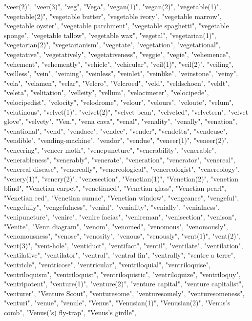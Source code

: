 "veer(2)",
"veer(3)",
"veg",
"Vega",
"vegan(1)",
"vegan(2)",
"vegetable(1)",
"vegetable(2)",
"vegetable butter",
"vegetable ivory",
"vegetable marrow",
"vegetable oyster",
"vegetable parchment",
"vegetable spaghetti",
"vegetable sponge",
"vegetable tallow",
"vegetable wax",
"vegetal",
"vegetarian(1)",
"vegetarian(2)",
"vegetarianism",
"vegetate",
"vegetation",
"vegetational",
"vegetative",
"vegetatively",
"vegetativeness",
"veggie",
"vegie",
"vehemence",
"vehement",
"vehemently",
"vehicle",
"vehicular",
"veil(1)",
"veil(2)",
"veiling",
"veilless",
"vein",
"veining",
"veinless",
"veinlet",
"veinlike",
"veinstone",
"veiny",
"vela",
"velamen",
"velar",
"Velcro",
"Velcroed",
"veld",
"veldschoen",
"veldt",
"veleta",
"velitation",
"velleity",
"vellum",
"velocimeter",
"velocipede",
"velocipedist",
"velocity",
"velodrome",
"velour",
"velours",
"veloute",
"velum",
"velutinous",
"velvet(1)",
"velvet(2)",
"velvet bean",
"velveted",
"velveteen",
"velvet glove",
"velvety",
"Ven.",
"vena cava",
"venal",
"venality",
"venally",
"venation",
"venational",
"vend",
"vendace",
"vendee",
"vender",
"vendetta",
"vendeuse",
"vendible",
"vending-machine",
"vendor",
"vendue",
"veneer(1)",
"veneer(2)",
"veneering",
"veneer-moth",
"venepuncture",
"venerability",
"venerable",
"venerableness",
"venerably",
"venerate",
"veneration",
"venerator",
"venereal",
"venereal disease",
"venereally",
"venereological",
"venereologist",
"venereology",
"venery(1)",
"venery(2)",
"venesection",
"Venetian(1)",
"Venetian(2)",
"venetian blind",
"Venetian carpet",
"venetianed",
"Venetian glass",
"Venetian pearl",
"Venetian red",
"Venetian sumac",
"Venetian window",
"vengeance",
"vengeful",
"vengefully",
"vengefulness",
"venial",
"veniality",
"venially",
"venialness",
"venipuncture",
"venire",
"venire facias",
"venireman",
"venisection",
"venison",
"Venite",
"Venn diagram",
"venom",
"venomed",
"venomous",
"venomously",
"venomousness",
"venose",
"venosity",
"venous",
"venously",
"vent(1)",
"vent(2)",
"vent(3)",
"vent-hole",
"ventiduct",
"ventifact",
"ventil",
"ventilate",
"ventilation",
"ventilative",
"ventilator",
"ventral",
"ventral fin",
"ventrally",
"ventre a terre",
"ventricle",
"ventricose",
"ventricular",
"ventriloquial",
"ventriloquise",
"ventriloquism",
"ventriloquist",
"ventriloquistic",
"ventriloquize",
"ventriloquy",
"ventripotent",
"venture(1)",
"venture(2)",
"venture capital",
"venture capitalist",
"venturer",
"Venture Scout",
"venturesome",
"venturesomely",
"venturesomeness",
"venturi",
"venue",
"venule",
"Venus",
"Venusian(1)",
"Venusian(2)",
"Venus's comb",
"Venus('s) fly-trap",
"Venus's girdle",
